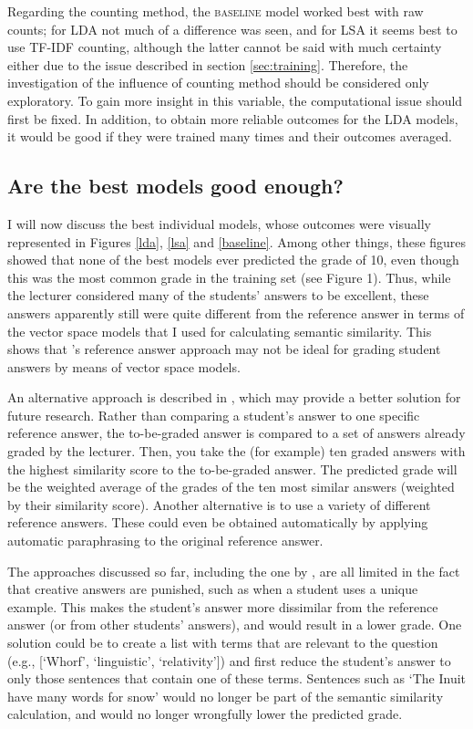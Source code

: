 \documentclass[a4paper,10pt,twoside]{article}
\begin{document}
Regarding the counting method, the \textsc{baseline} model worked best with raw counts; for LDA not much of a difference was seen, and for LSA it seems best to use TF-IDF counting, although the latter cannot be said with much certainty either due to the issue described in section \ref{sec:training}. Therefore, the investigation of the influence of counting method should be considered only exploratory. To gain more insight in this variable, the computational issue should first be fixed. In addition, to obtain more reliable outcomes for the LDA models, it would be good if they were trained many times and their outcomes averaged. 

\subsection{Are the best models good enough?}
I will now discuss the best individual models, whose outcomes were visually represented in Figures \ref{lda}, \ref{lsa} and \ref{baseline}. Among other things, these figures showed that none of the best models ever predicted the grade of 10, even though this was the most common grade in the training set (see Figure 1). Thus, while the lecturer considered many of the students' answers to be excellent, these answers apparently still were quite different from the reference answer in terms of the vector space models that I used for calculating semantic similarity. This shows that 's reference answer approach may not be ideal for grading student answers by means of vector space models.

An alternative approach is described in , which may provide a better solution for future research. Rather than comparing a student's answer to one specific reference answer, the to-be-graded answer is compared to a set of answers already graded by the lecturer. Then, you take the (for example) ten graded answers with the highest similarity score to the to-be-graded answer. The predicted grade will be the weighted average of the grades of the ten most similar answers (weighted by their similarity score). Another alternative is to use a variety of different reference answers. These could even be obtained automatically by applying automatic paraphrasing to the original reference answer.

The approaches discussed so far, including the one by , are all limited in the fact that creative answers are punished, such as when a student uses a unique example. This makes the student's answer more dissimilar from the reference answer (or from other students' answers), and would result in a lower grade. One solution could be to create a list with terms that are relevant to the question (e.g., [`Whorf', `linguistic', `relativity']) and first reduce the student's answer to only those sentences that contain one of these terms. Sentences such as `The Inuit have many words for snow' would no longer be part of the semantic similarity calculation, and would no longer wrongfully lower the predicted grade.
\end{document}
